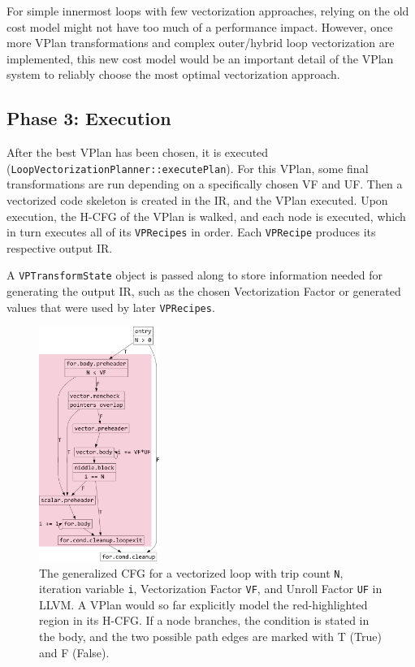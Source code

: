 \documentclass[sigplan,11pt,nonacm]{acmart}
\begin{document}
For simple innermost loops with few vectorization approaches,
relying on the old cost model might not have too much of a performance impact. 
However, once more VPlan transformations and complex
outer/hybrid loop vectorization are implemented, this new cost model would be an important
detail of the VPlan system to reliably choose the most optimal vectorization approach.

\subsection{Phase 3: Execution}
After the best VPlan has been chosen, it is executed (\texttt{LoopVectorizationPlanner::executePlan}).
For this VPlan, some final transformations are run depending on a specifically chosen VF and UF.
Then a vectorized code skeleton is created in the IR, and the VPlan executed. 
Upon execution, the H-CFG of the VPlan is walked, and each node is executed, which in turn executes all 
of its \texttt{VPRecipes} in order. Each \texttt{VPRecipe} produces its respective output IR.

A \texttt{VPTransformState} object is passed along to store information 
needed for generating the output IR, such as the chosen Vectorization Factor or generated values that were 
used by later \texttt{VPRecipes}.

\begin{figure}
  \centering
  \includegraphics[width=0.35\textwidth]{images/inner-loop-vec-loop-cfg-color.png}
  \caption{The generalized CFG for a vectorized loop with trip count \texttt{N}, 
  iteration variable \texttt{i}, Vectorization Factor \texttt{VF}, 
  and Unroll Factor \texttt{UF} in LLVM. A VPlan would so far explicitly model the red-highlighted 
  region in its H-CFG. If a node branches, the condition is stated in the body, and the two possible 
  path edges are marked with T (True) and F (False).}
  \label{fig:inner-loop-vec-cfg}
\end{figure}
\end{document}
